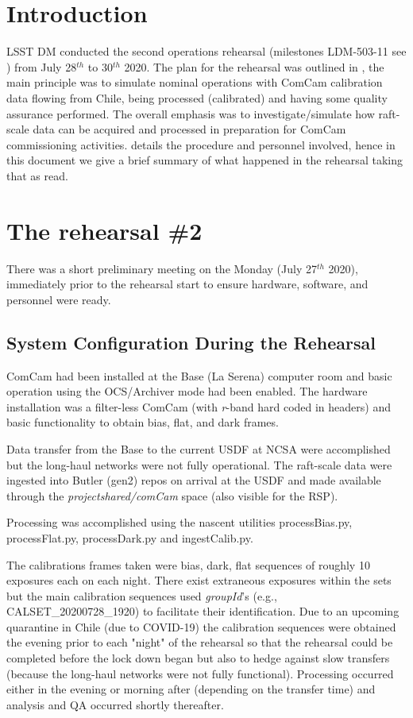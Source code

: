 \section{Introduction} \label{sec:intro}

LSST DM conducted the second operations rehearsal (milestones LDM-503-11 see ) from July 28$^{th}$ to 30$^{th}$ 2020.
The plan for the rehearsal was outlined in , the main principle was to simulate
nominal operations with ComCam calibration data flowing from Chile, being processed (calibrated)
and having some quality assurance performed.  The overall emphasis was to investigate/simulate how
raft-scale data can be acquired and processed in preparation for ComCam commissioning activities.
 details the procedure and personnel involved,
hence in this document we give a brief summary of what  happened in the rehearsal taking that as read.


\section{The rehearsal \#2}

There was a short preliminary meeting on the Monday (July 27$^{th}$ 2020), immediately prior to the
rehearsal start to ensure hardware, software, and personnel were ready.

\subsection{System Configuration During the Rehearsal} \label{sec:setup}

ComCam had been installed at the Base (La Serena) computer room and basic operation using the OCS/Archiver
mode had been enabled.  The hardware installation was a filter-less ComCam (with {\it r}-band hard coded
in headers) and basic functionality to obtain bias, flat, and dark frames.

Data transfer from the Base to the current USDF at NCSA were accomplished but the long-haul networks were not
fully operational.  The raft-scale data were ingested into Butler (gen2) repos on arrival at the USDF
and made available through the {\it \/project\/shared/comCam} space (also visible for the RSP).

Processing was accomplished using the nascent utilities processBias.py, processFlat.py, processDark.py
and ingestCalib.py.

The calibrations frames taken were bias, dark, flat sequences of roughly 10 exposures each on each night.
There exist extraneous exposures within the sets but the main calibration sequences used {\it groupId}'s
(e.g., CALSET\_20200728\_1920) to facilitate their identification.  Due to an upcoming quarantine in Chile
(due to COVID-19) the calibration sequences were obtained the evening prior to each "night" of the
rehearsal so that the rehearsal could be completed before the lock down began but also to hedge against
slow transfers (because the long-haul networks were not fully functional).  Processing occurred either
in the evening or morning after (depending on the transfer time) and analysis and QA occurred
shortly thereafter.

